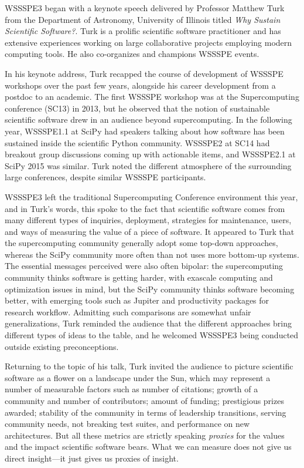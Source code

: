 \documentclass[11pt, oneside]{amsart}
\begin{document}
WSSSPE3 began with a keynote speech delivered by Professor Matthew Turk from the
Department of Astronomy, University of Illinois titled \emph{Why Sustain
Scientific Software?}. Turk is a prolific scientific software practitioner and
has extensive experiences working on large collaborative projects employing
modern computing tools. He also co-organizes and champions WSSSPE events.

In his keynote address, Turk recapped the course of development of WSSSPE
workshops over the past few years, alongside his career development from a
postdoc to an academic. The first WSSSPE workshop was at the Supercomputing
conference (SC13) in 2013, but he observed that the notion of sustainable
scientific software drew in an audience beyond supercomputing. In the following
year, WSSSPE1.1 at SciPy had speakers talking about how software has been
sustained inside the scientific Python community. WSSSPE2 at SC14 had breakout
group discussions coming up with actionable items, and WSSSPE2.1 at SciPy 2015
was similar. Turk noted the different atmosphere of the surrounding large
conferences, despite similar WSSSPE participants.

WSSSPE3 left the traditional Supercomputing Conference environment this year,
and in Turk's words, this spoke to the fact that scientific software comes from
many different types of inquiries, deployment, strategies for maintenance,
users, and ways of measuring the value of a piece of software. It appeared to
Turk that the supercomputing community generally adopt some top-down approaches,
whereas the SciPy community more often than not uses more bottom-up systems. The
essential messages perceived were also often bipolar: the supercomputing
community thinks software is getting harder, with exascale computing and
optimization issues in mind, but the SciPy community thinks software becoming
better, with emerging tools such as Jupiter and productivity packages for
research workflow. Admitting such comparisons are somewhat unfair
generalizations, Turk reminded the audience that the different approaches bring
different types of ideas to the table, and he welcomed WSSSPE3 being conducted
outside existing preconceptions.

Returning to the topic of his talk, Turk invited the audience to picture
scientific software as a flower on a landscape under the Sun, which may
represent a number of measurable factors such as number of citations; growth of
a community and number of contributors; amount of funding; prestigious prizes
awarded; stability of the community in terms of leadership transitions, serving
community needs, not breaking test suites, and performance on new architectures.
But all these metrics are strictly speaking \emph{proxies} for the values and
the impact scientific software bears. What we can measure does not give us
direct insight---it just gives us proxies of insight.
  
\end{document}
